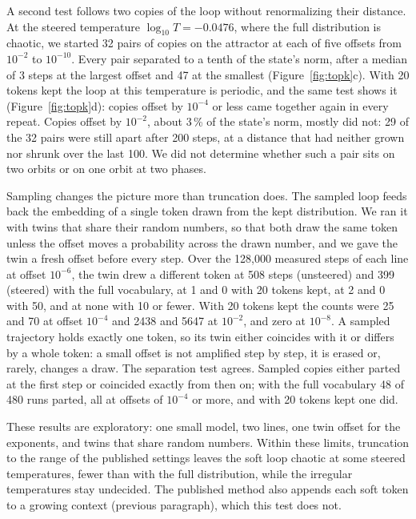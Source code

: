 \documentclass[11pt,letterpaper]{article}
\begin{document}
A second test follows two copies of the loop without renormalizing their distance. At the steered temperature
$\log_{10}T=-0.0476$, where the full distribution is chaotic, we started 32 pairs of copies on the attractor at each of
five offsets from $10^{-2}$ to $10^{-10}$. Every pair separated to a tenth of the state's norm, after a median of 3
steps at the largest offset and 47 at the smallest (Figure~\ref{fig:topk}c). With 20 tokens kept the loop at this
temperature is periodic, and the same test shows it (Figure~\ref{fig:topk}d): copies offset by $10^{-4}$ or less came
together again in every repeat. Copies offset by $10^{-2}$, about 3\,\% of the state's norm, mostly did not: 29 of the
32 pairs were still apart after 200 steps, at a distance that had neither grown nor shrunk over the last 100. We did
not determine whether such a pair sits on two orbits or on one orbit at two phases.

Sampling changes the picture more than truncation does. The sampled loop feeds back the embedding of a single token
drawn from the kept distribution. We ran it with twins that share their random numbers, so that both draw the same
token unless the offset moves a probability across the drawn number, and we gave the twin a fresh offset before every
step. Over the 128{,}000 measured steps of each line at offset $10^{-6}$, the twin drew a different token at 508 steps
(unsteered) and 399 (steered) with the full vocabulary, at 1 and 0 with 20 tokens kept, at 2 and 0 with 50, and at
none with 10 or fewer. With 20 tokens kept the counts were 25 and 70 at offset $10^{-4}$ and 2438 and 5647 at
$10^{-2}$, and zero at $10^{-8}$. A sampled trajectory holds exactly one token, so its twin either coincides with it
or differs by a whole token: a small offset is not amplified step by step, it is erased or, rarely, changes a draw. The
separation test agrees. Sampled copies either parted at the first step or coincided exactly from then on; with the
full vocabulary 48 of 480 runs parted, all at offsets of $10^{-4}$ or more, and with 20 tokens kept one did.

These results are exploratory: one small model, two lines, one twin offset for the exponents, and twins that share
random numbers. Within these limits, truncation to the range of the published settings leaves the soft loop chaotic
at some steered temperatures, fewer than with the full distribution, while the irregular temperatures stay undecided.
The published method also appends each soft token to a growing context (previous paragraph), which this test does not.
\end{document}
